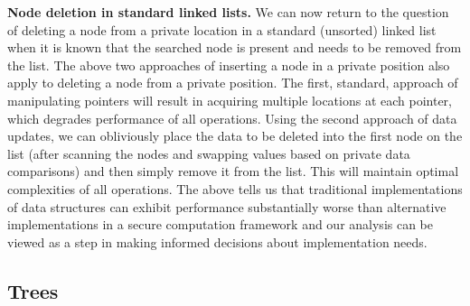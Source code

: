 \documentclass[11pt]{article}
\begin{document}
\medskip \noindent \textbf{Node deletion in standard linked lists.}
We can now return to the question of deleting a node from a private location
in a standard (unsorted) linked list when it is known that the searched node
is present and needs to be removed from the list. The above two approaches
of inserting a node in a private position also apply to deleting a node from
a private position. The first, standard, approach of manipulating pointers
will result in acquiring multiple locations at each pointer, which degrades
performance of all operations. Using the second approach of data updates, we
can obliviously place the data to be deleted into the first node on the list
(after scanning the nodes and swapping values based on private data
comparisons) and then simply remove it from the list. This will maintain
optimal complexities of all operations. The above tells us that traditional
implementations of data structures can exhibit performance substantially
worse than alternative implementations in a secure computation framework and
our analysis can be viewed as a step in making informed decisions about
implementation needs. 

\subsection{Trees}
\end{document}
